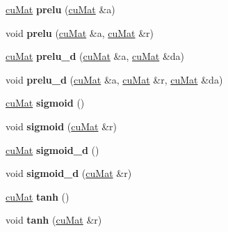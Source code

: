 \begin{DoxyCompactItemize}
\item 
\mbox{\label{classcuMat_afe938d720e81b7f847bd274463e5b9c4}} 
\mbox{\hyperlink{classcuMat}{cu\+Mat}} {\bfseries prelu} (\mbox{\hyperlink{classcuMat}{cu\+Mat}} \&a)
\item 
\mbox{\label{classcuMat_a19612852a27ae9c3eb204f28f989065d}} 
void {\bfseries prelu} (\mbox{\hyperlink{classcuMat}{cu\+Mat}} \&a, \mbox{\hyperlink{classcuMat}{cu\+Mat}} \&r)
\item 
\mbox{\label{classcuMat_ace63ad02b3d4e4c6308a15680809299d}} 
\mbox{\hyperlink{classcuMat}{cu\+Mat}} {\bfseries prelu\+\_\+d} (\mbox{\hyperlink{classcuMat}{cu\+Mat}} \&a, \mbox{\hyperlink{classcuMat}{cu\+Mat}} \&da)
\item 
\mbox{\label{classcuMat_ad07756ce28f73fd3298171ce67fede94}} 
void {\bfseries prelu\+\_\+d} (\mbox{\hyperlink{classcuMat}{cu\+Mat}} \&a, \mbox{\hyperlink{classcuMat}{cu\+Mat}} \&r, \mbox{\hyperlink{classcuMat}{cu\+Mat}} \&da)
\item 
\mbox{\label{classcuMat_a259b3d76fe6f532e1ff0fbf6e1dc7c39}} 
\mbox{\hyperlink{classcuMat}{cu\+Mat}} {\bfseries sigmoid} ()
\item 
\mbox{\label{classcuMat_ab942134262cd23c3d8a4de6be52c48b4}} 
void {\bfseries sigmoid} (\mbox{\hyperlink{classcuMat}{cu\+Mat}} \&r)
\item 
\mbox{\label{classcuMat_aec68bf45e13bd9696388b9645cd5514f}} 
\mbox{\hyperlink{classcuMat}{cu\+Mat}} {\bfseries sigmoid\+\_\+d} ()
\item 
\mbox{\label{classcuMat_aff8346440fbb6e08a4403623eb48fee6}} 
void {\bfseries sigmoid\+\_\+d} (\mbox{\hyperlink{classcuMat}{cu\+Mat}} \&r)
\item 
\mbox{\label{classcuMat_a4810d9d55afb758d7e73ac2ff87bdf67}} 
\mbox{\hyperlink{classcuMat}{cu\+Mat}} {\bfseries tanh} ()
\item 
\mbox{\label{classcuMat_a2963d3fcdedce6daeea48f7797e6adbb}} 
void {\bfseries tanh} (\mbox{\hyperlink{classcuMat}{cu\+Mat}} \&r)
\item 

\end{DoxyCompactItemize}
